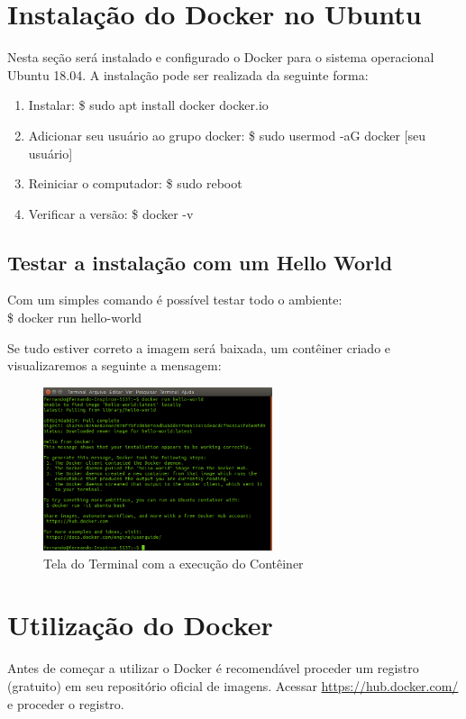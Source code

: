 \documentclass[a4paper,11pt]{article}
\begin{document}
\section{Instalação do Docker no Ubuntu}
Nesta seção será instalado e configurado o Docker para o sistema operacional Ubuntu 18.04. A instalação pode ser realizada da seguinte forma: \vspace{-1em}
\begin{enumerate}
  \item Instalar: {\ttfamily\$ sudo apt install docker docker.io}
  \item Adicionar seu usuário ao grupo docker: {\ttfamily\$ sudo usermod -aG docker [seu usuário]}
  \item Reiniciar o computador: {\ttfamily\$ sudo reboot}
  \item Verificar a versão: {\ttfamily\$ docker -v}
\end{enumerate}

\subsection{Testar a instalação com um Hello World}
Com um simples comando é possível testar todo o ambiente: \\
{\ttfamily\$ docker run hello-world}

Se tudo estiver correto a imagem será baixada, um contêiner criado e visualizaremos a seguinte a mensagem:
\begin{figure}[H]
	\centering
	\includegraphics[width=0.6\textwidth]{imagem/hello.png}
	\caption{Tela do Terminal com a execução do Contêiner}
\end{figure}

\section{Utilização do Docker}
Antes de começar a utilizar o Docker é recomendável proceder um registro (gratuito) em seu repositório oficial de imagens. Acessar \url{https://hub.docker.com/} e proceder o registro.
\end{document}
